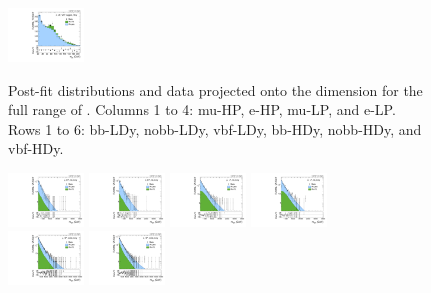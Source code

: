 \begin{figure}[htbp]
  \includegraphics[width=0.18\textwidth]{fig/analysisAppendix/PostFit_SR_MJJ__e_LP_vbf_HDy_Run2.pdf}\\
  \caption{
    Post-fit distributions and data projected onto the \MJ dimension for the full range of \MVV.
    Columns 1 to 4: mu-HP, e-HP, mu-LP, and e-LP.
    Rows 1 to 6: bb-LDy, nobb-LDy, vbf-LDy, bb-HDy, nobb-HDy, and vbf-HDy.
  }
  \label{fig:postfit_MJJ_Run2}
\end{figure}

\begin{figure}[htbp]
  \centering
  \includegraphics[width=0.18\textwidth]{fig/analysisAppendix/PostFit_SR_MVV__mu_HP_bb_LDy_Run2.pdf}
  \includegraphics[width=0.18\textwidth]{fig/analysisAppendix/PostFit_SR_MVV__e_HP_bb_LDy_Run2.pdf}
  \includegraphics[width=0.18\textwidth]{fig/analysisAppendix/PostFit_SR_MVV__mu_LP_bb_LDy_Run2.pdf}
  \includegraphics[width=0.18\textwidth]{fig/analysisAppendix/PostFit_SR_MVV__e_LP_bb_LDy_Run2.pdf}\\
  \includegraphics[width=0.18\textwidth]{fig/analysisAppendix/PostFit_SR_MVV__mu_HP_nobb_LDy_Run2.pdf}
  \includegraphics[width=0.18\textwidth]{fig/analysisAppendix/PostFit_SR_MVV__e_HP_nobb_LDy_Run2.pdf}

\end{figure}
